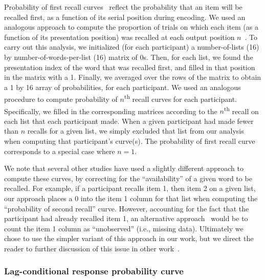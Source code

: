 \documentclass[11pt]{article}
\begin{document}
Probability of first recall curves~\citep{AtkiShif68, PostPhil65, WelcBurn24}
reflect the probability that an item will be recalled first, as a function of
its serial position during encoding. We used an analogous approach to compute
the proportion of trials on which each item (as a function of its presentation
position) was recalled at each output position $n$~\citep{Hoga75, HowaKaha99,
PolyEtal09, ZhanEtal23}. To carry out this analysis, we initialized (for each
participant) a number-of-lists (16) by number-of-words-per-list (16) matrix of
0s. Then, for each list, we found the presentation index of the word that was
recalled first, and filled in that position in the matrix with a 1. Finally, we
averaged over the rows of the matrix to obtain a 1 by 16 array of
probabilities, for each participant. We used an analogous procedure to compute
probability of $n$\textsuperscript{th} recall curves for each participant.
Specifically, we filled in the corresponding matrices according to the
$n$\textsuperscript{th} recall on each list that each participant made. When a
given participant had made fewer than $n$ recalls for a given list, we simply
excluded that list from our analysis when computing that participant's
curve(s). The probability of first recall curve corresponds to a special case
where $n = 1$.

We note that several other studies have used a slightly different approach to
compute these curves, by correcting for the ``availability'' of a given word to
be recalled. For example, if a participant recalls item 1, then item 2 on a
given list, our approach places a 0 into the item 1 column for that list when
computing the ``probability of second recall'' curve. However, accounting for
the fact that the participant had already recalled item 1, an alternative
approach~\citep[e.g.,][]{Farr10} would be to count the item 1 column as
``unobserved'' (i.e., missing data). Ultimately we chose to use the simpler
variant of this approach in our work, but we direct the reader to further
discussion of this issue in other work~\citep{MoraGosh14, Farr14}.

\subsubsection*{Lag-conditional response probability curve}
\end{document}

